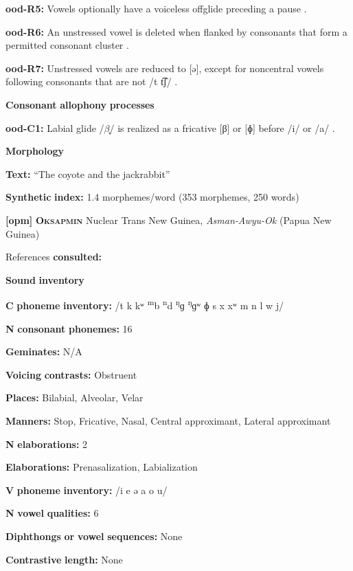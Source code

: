 \textbf{ood-R5:} Vowels optionally have a voiceless offglide preceding a pause \citep[31]{Saxton1963}.

\textbf{ood-R6:} An unstressed vowel is deleted when flanked by consonants that form a permitted consonant cluster \citep[103]{Saxton1982}.

\textbf{ood-R7:} Unstressed vowels are reduced to [ə], except for noncentral vowels following consonants that are not /t t͡ʃ/ \citep[104]{Saxton1982}.

\textbf{Consonant} \textbf{allophony} \textbf{processes}

\textbf{ood-C1:} Labial glide /$\beta ̞$/ is realized as a fricative [β] or [ɸ] before /i/ or /a/ \citep[31]{Saxton1963}.

\textbf{Morphology}

\textbf{Text:} “The coyote and the jackrabbit” \citep[263-266]{Saxton1982}

\textbf{Synthetic} \textbf{index:} 1.4 morphemes/word (353 morphemes, 250 words)

\textbf{[opm]}   \textbf{\textsc{Oksapmin}}  Nuclear Trans New Guinea, \textit{Asman-Awyu-Ok} (Papua New Guinea)

References \textbf{consulted:} \citet{Loughnane2009}

\textbf{Sound} \textbf{inventory}

\textbf{C} \textbf{phoneme} \textbf{inventory:} /t k kʷ \textsuperscript{m}b \textsuperscript{n}d \textsuperscript{ŋ}ɡ \textsuperscript{ŋ}ɡʷ ɸ s x xʷ m n l w j/

\textbf{N} \textbf{consonant} \textbf{phonemes:} 16

\textbf{Geminates:} N/A

\textbf{Voicing} \textbf{contrasts:} Obstruent

\textbf{Places:} Bilabial, Alveolar, Velar

\textbf{Manners:} Stop, Fricative, Nasal, Central approximant, Lateral approximant

\textbf{N} \textbf{elaborations:} 2

\textbf{Elaborations:} Prenasalization, Labialization

\textbf{V} \textbf{phoneme} \textbf{inventory:} /i e ə a o u/

\textbf{N} \textbf{vowel} \textbf{qualities:} 6

\textbf{Diphthongs} \textbf{or} \textbf{vowel} \textbf{sequences:} None

\textbf{Contrastive} \textbf{length:} None

